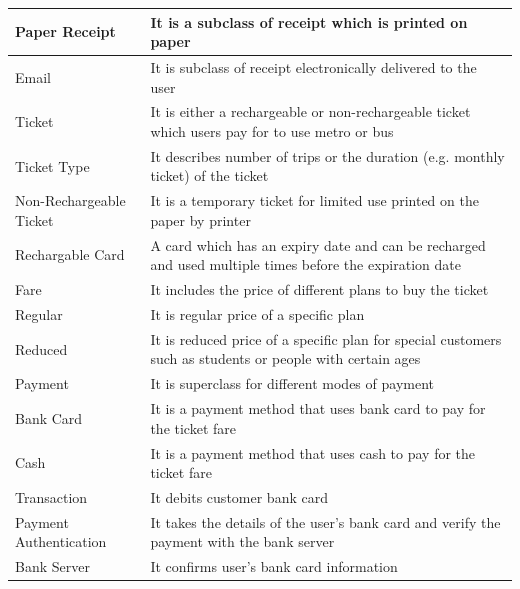\documentclass[a4paper,12pt]{report}
\begin{document}
\setlength{\tabcolsep}{18pt}
\renewcommand{\arraystretch}{1.5}
\begin{tabular}[H]{ |p{3cm}|p{12cm}| }
	\hline
	Paper Receipt & It is a subclass of receipt which is printed on paper
	\\
	\hline
	Email & It is subclass of receipt electronically delivered to the user
	\\
	\hline
	Ticket & It is either a rechargeable or non-rechargeable ticket which users pay for to use metro or bus
	\\
	\hline
	Ticket Type & It describes number of trips or the duration (e.g. monthly ticket) of the ticket
	\\
	\hline
	Non-Rechargeable Ticket & It is a temporary ticket for limited use printed on the paper by printer
	\\
	\hline
	Rechargable Card & A card which has an expiry date and can be recharged and used multiple times before the expiration date
	\\
	\hline
	Fare & It includes the price of different plans to buy the ticket
	\\
	\hline
	Regular & It is regular price of a specific plan
	\\
	\hline
	Reduced & It is reduced price of a specific plan for special customers such as students or people with certain ages
	\\
	\hline
	Payment & It is superclass for different modes of payment
	\\
	\hline
	Bank Card & It is a payment method that uses bank card to pay for the ticket fare
	\\
	\hline
	Cash & It is a payment method that uses cash to pay for the ticket fare
	\\
	\hline
	Transaction & It debits customer bank card  
	\\
	\hline
	Payment Authentication & It takes the details of the user’s bank card and verify the payment with the bank server
	\\
	\hline
	Bank Server & It confirms user’s bank card information
	\\
	\hline
\end{tabular}
\\ 


\newpage
\end{document}
